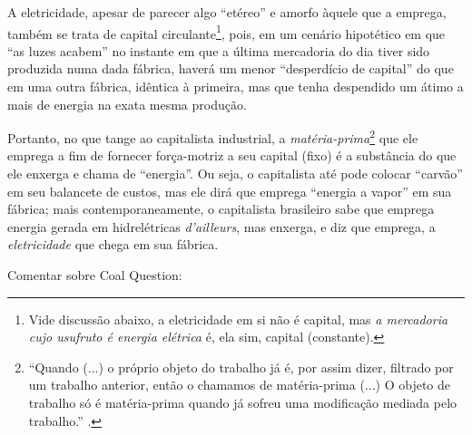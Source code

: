 \documentclass[12pt]{article}
\begin{document}
A eletricidade, apesar de parecer algo ``etéreo'' e amorfo àquele que a emprega, também se trata de capital circulante\footnote{Vide discussão abaixo, a eletricidade em si não é capital, mas \textit{a mercadoria cujo usufruto é energia elétrica} é, ela sim, capital (constante).}, pois, em um cenário hipotético em que ``as luzes acabem'' no instante em que a última mercadoria do dia tiver sido produzida numa dada fábrica, haverá um menor ``desperdício de capital'' do que em uma outra fábrica, idêntica à primeira, mas que tenha despendido um átimo a mais de energia na exata mesma produção.

Portanto, no que tange ao capitalista industrial, a \textit{matéria-prima}\footnote{``Quando (...) o próprio objeto do trabalho já é, por assim dizer, filtrado por um trabalho anterior, então o chamamos de matéria-prima (...) O objeto de trabalho só é matéria-prima quando já sofreu uma modificação mediada pelo trabalho.'' \cite[p. 256]{Marx2017}.} que ele emprega a fim de fornecer força-motriz a seu capital (fixo) é a substância do que ele enxerga e chama de ``energia''. Ou seja, o capitalista até pode colocar ``carvão'' em seu balancete de custos, mas ele dirá que emprega ``energia a vapor'' em sua fábrica; mais contemporaneamente, o capitalista brasileiro sabe que emprega energia gerada em hidrelétricas \textit{d'ailleurs}, mas enxerga, e diz que emprega, a \textit{eletricidade} que chega em sua fábrica. 


Comentar sobre Coal Question:
\end{document}
